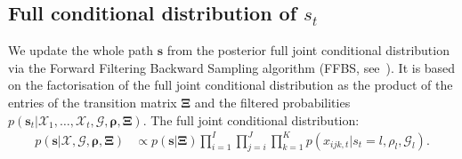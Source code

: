 \documentclass[12pt,a4paper]{article}
\theoremstyle{custom}
\begin{document}
\subsection{Full conditional distribution of $s_t$}\label{sec:posterior_s_t}
We update the whole path $\mathbf{s}$ from the posterior full joint conditional distribution via the Forward Filtering Backward Sampling algorithm (FFBS, see~\cite{Fruhwirth06FiniteMixtures_MarkovSwitch_book}). It is based on the factorisation of the full joint conditional distribution as the product of the entries of the transition matrix $\boldsymbol{\Xi}$ and the filtered probabilities $p(\mathbf{s}_t | \mathcal{X}_{1},\ldots,\mathcal{X}_t,\mathcal{G},\boldsymbol{\rho},\boldsymbol{\Xi})$. The full joint conditional distribution:
\begin{align*}
p(\mathbf{s} | \boldsymbol{\mathcal{X}},\mathcal{G},\boldsymbol{\rho},\boldsymbol{\Xi}) & \propto p(\mathbf{s}|\boldsymbol{\Xi}) \prod_{i=1}^I \prod_{j=i}^J \prod_{k=1}^K  p(x_{ijk,t} | s_t=l, \rho_l, \mathcal{G}_l).
\end{align*}
\end{document}
